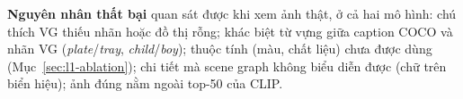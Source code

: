 \textbf{Nguyên nhân thất bại} quan sát được khi xem ảnh thật, ở cả hai mô hình: chú thích VG thiếu nhãn hoặc đồ thị rỗng;
khác biệt từ vựng giữa caption COCO và nhãn VG (\emph{plate}/\emph{tray}, \emph{child}/\emph{boy}); thuộc tính (màu, chất
liệu) chưa được dùng (Mục~\ref{sec:l1-ablation}); chi tiết mà scene graph không biểu diễn được (chữ trên biển hiệu); ảnh đúng
nằm ngoài top-50 của CLIP.
